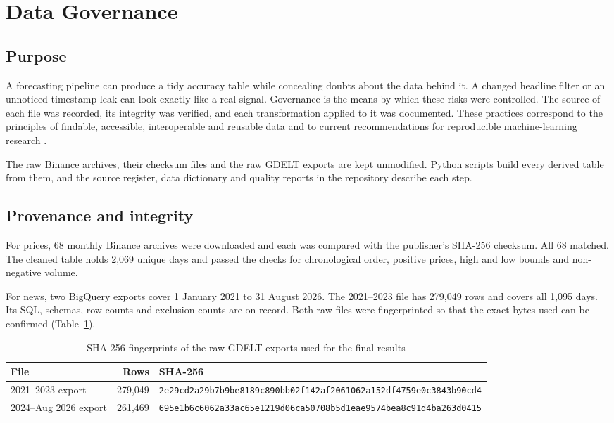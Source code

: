 \section{Data Governance}
\label{ch:governance}
\subsection{Purpose}
A forecasting pipeline can produce a tidy accuracy table while concealing doubts about the data behind it. A changed headline filter or an unnoticed timestamp leak can look exactly like a real signal. Governance is the means by which these risks were controlled. The source of each file was recorded, its integrity was verified, and each transformation applied to it was documented. These practices correspond to the principles of findable, accessible, interoperable and reusable data \cite{wilkinson2016} and to current recommendations for reproducible machine-learning research \cite{pineau2021}.

The raw Binance archives, their checksum files and the raw GDELT exports are kept unmodified. Python scripts build every derived table from them, and the source register, data dictionary and quality reports in the repository describe each step.

\subsection{Provenance and integrity}
For prices, 68 monthly Binance archives were downloaded and each was compared with the publisher's SHA-256 checksum. All 68 matched. The cleaned table holds 2,069 unique days and passed the checks for chronological order, positive prices, high and low bounds and non-negative volume.

For news, two BigQuery exports cover 1 January 2021 to 31 August 2026. The 2021--2023 file has 279,049 rows and covers all 1,095 days. Its SQL, schemas, row counts and exclusion counts are on record. Both raw files were fingerprinted so that the exact bytes used can be confirmed (Table~\ref{tab:hashes}).

\begin{table}[htbp]\centering\small
\caption{SHA-256 fingerprints of the raw GDELT exports used for the final results}\label{tab:hashes}
\begin{tabularx}{\textwidth}{p{3.4cm}rX}
\toprule
File & Rows & SHA-256\\\midrule
2021--2023 export & 279,049 & \texttt{\tiny 2e29cd2a29b7b9be8189c890bb02f142af2061062a152df4759e0c3843b90cd4}\\
2024--Aug 2026 export & 261,469 & \texttt{\tiny 695e1b6c6062a33ac65e1219d06ca50708b5d1eae9574bea8c91d4ba263d0415}\\
\bottomrule
\end{tabularx}
\end{table}


